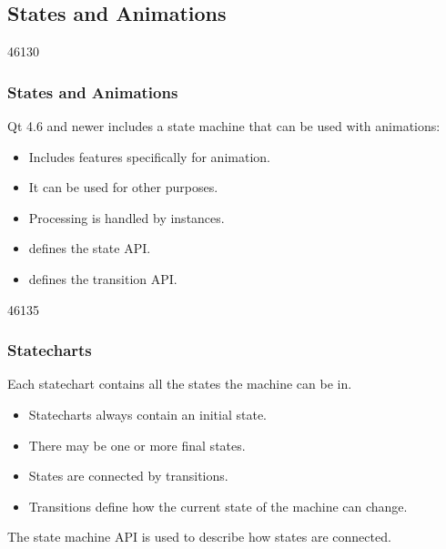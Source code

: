 %
%
%
%

\subsection{States and Animations}

\begin{slide}{46130}\frametitle{States and Animations}
\vspace*{1.5em}
Qt 4.6 and newer includes a state machine that can be used with animations:
\begin{itemize}
\item Includes features specifically for animation.
\item It can be used for other purposes.
\item Processing is handled by  instances.
\item {} defines the state API.
\item {} defines the transition API.
\end{itemize}
\end{slide}

\begin{slide}{46135}\frametitle{Statecharts}
\vspace*{1.5em}
Each statechart contains all the states the machine can be in.

\begin{itemize}
\item Statecharts always contain an initial state.
\item There may be one or more final states.
\item States are connected by transitions.
\item Transitions define how the current state of the machine can change.
\end{itemize}

The state machine API is used to describe how states are connected.
\end{slide}

